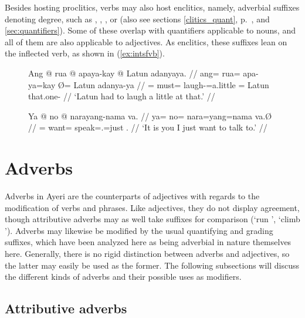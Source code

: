 Besides hosting proclitics, verbs may also host enclitics, namely,
adverbial suffixes denoting degree, such as
,
,
, or
(also see sections \ref{clitics_quant}, p.~\pageref{clitics_quant}, and
\ref{sec:quantifiers}). Some of these overlap with quantifiers
applicable to nouns, and all of them are also applicable to adjectives. As
enclitics, these suffixes lean on the inflected verb, as shown in 
(\ref{ex:intsfvb}).

\begin{figure}[h]
\pex\label{ex:intsfvb}
\a\label{ex:verbquant}\begingl
	\gla Ang @ rua @ apaya-kay {} @ Latun adanyaya. //
	\glb ang= rua= apa-ya=kay Ø= Latun adanya-ya //
	\glc \AgtT{}= must= laugh-\TsgM{}=a.little \Top{}= Latun that.one-\Loc{} //
	\glft `Latun had to laugh a little at that.' //
\endgl

\a\begingl
	\gla Ya @ no @ narayang-nama va. //
	\glb ya= no= nara=yang=nama va.Ø //
	\glc \LocT{}= want= speak=\Fsg{}.\Aarg{}=just \Second{}.\Top{} //
	\glft `It is you I just want to talk to.' //
\endgl
\xe
\end{figure}


\section{Adverbs}
\label{sec:adverbs}

Adverbs in Ayeri are the counterparts of adjectives with regards to the
modification of verbs and phrases. Like adjectives, they do not display
agreement, though attributive adverbs may as well take suffixes for comparison
(`run ', `climb '). Adverbs may likewise be modified by
the usual quantifying and grading suffixes, which have been analyzed here as
being adverbial in nature themselves here. Generally, there is no rigid
distinction between adverbs and adjectives, so the latter may easily be used as
the former. The following subsections will discuss the different kinds of
adverbs and their possible uses as modifiers.

\subsection{Attributive adverbs}

